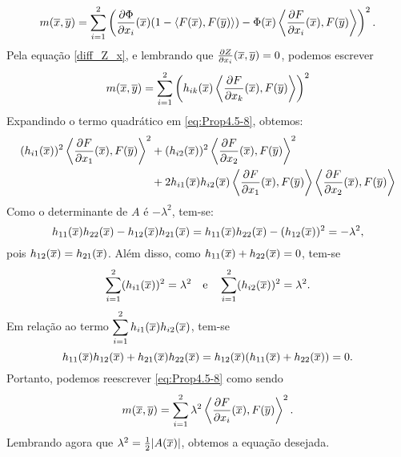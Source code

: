 \begin{demonstracao}
\[	m(\overline{x},\overline{y}) = \sum_{i=1}^2 \left(  \frac{\partial \Phi}{\partial x_i}(\overline{x})
	(1 - \langle F(\overline{x}),F(\overline{y}) \rangle) - \Phi(\overline{x}) \left\langle 
	\frac{\partial F}{\partial x_i}(\overline{x}), F(\overline{y}) \right\rangle \right)^2.
	\]
	Pela equação \eqref{diff_Z_x}, e lembrando que 
	$\frac{\partial Z}{\partial x_i}(\overline{x},\overline{y})=0$, podemos escrever
	\begin{eqnarray} \label{eq:Prop4.5-8}
	m(\overline{x},\overline{y}) = \sum_{i=1}^2 \left( h_{ik}(\overline{x}) 
	\left\langle \frac{\partial F}{\partial x_k}(\overline{x}), F(\overline{y}) \right\rangle \right)^2
	\end{eqnarray}	
	Expandindo o termo quadr\'atico em \eqref{eq:Prop4.5-8}, obtemos:
	\begin{eqnarray*}
		\begin{aligned}
			(h_{i1}(\overline{x}))^2 \left\langle \frac{\partial F}{\partial x_1}(\overline{x}), F(\overline{y})\right\rangle^2 
			&+ 
			(h_{i2}(\overline{x}))^2 \left\langle \frac{\partial F}{\partial x_2}(\overline{x}),F(\overline{y})\right\rangle^2 \\
			&+ 
			2 h_{i1}(\overline{x}) h_{i2}(\overline{x}) \left\langle \frac{\partial F}
			{\partial x_1}(\overline{x}), F(\overline{y}) \right\rangle \left\langle 
			\frac{\partial F}{\partial x_2}(\overline{x}), F(\overline{y}) \right\rangle
		\end{aligned}
	\end{eqnarray*}	
	Como o determinante de $A$ \'e $-\lambda^2$, tem-se:
	\begin{equation*}
	h_{11}(\overline{x}) h_{22}(\overline{x}) - h_{12}(\overline{x}) h_{21}(\overline{x}) = h_{11}(\overline{x}) h_{22}(\overline{x}) - (h_{12}(\overline{x}))^2 = -\lambda^2,
	\end{equation*}	
	pois $h_{12}(\overline{x}) = h_{21}(\overline{x})$. Al\'em disso, como 
	$h_{11}(\overline{x}) + h_{22}(\overline{x}) = 0$, tem-se
	\[
	\sum_{i=1}^2 (h_{i1}(\overline{x}))^2 = \lambda^2 \quad\mbox{e}\quad
	\sum_{i=1}^2 (h_{i2}(\overline{x}))^2 = \lambda^2.
	\]
	Em rela\c c\~ao ao termo $\displaystyle\sum_{i=1}^2 h_{i1}(\overline{x}) h_{i2}(\overline{x})$,
	tem-se
	\begin{equation*}
	h_{11}(\overline{x}) h_{12}(\overline{x}) + h_{21}(\overline{x}) h_{22}(\overline{x}) = h_{12}(\overline{x}) (h_{11}(\overline{x}) + h_{22}(\overline{x})) = 0.
	\end{equation*}	
	Portanto, podemos reescrever \eqref{eq:Prop4.5-8} como sendo
	\begin{equation*}
	m(\overline{x},\overline{y}) = \sum_{i=1}^2 \lambda^2 \left\langle 
	\frac{\partial F}{\partial x_i}(\overline{x}), F(\overline{y}) \right\rangle^2.
	\end{equation*}	
	Lembrando agora que $\lambda^2 = \frac{1}{2} |A(\overline{x})|$, obtemos
	a equação desejada.
\end{demonstracao}


